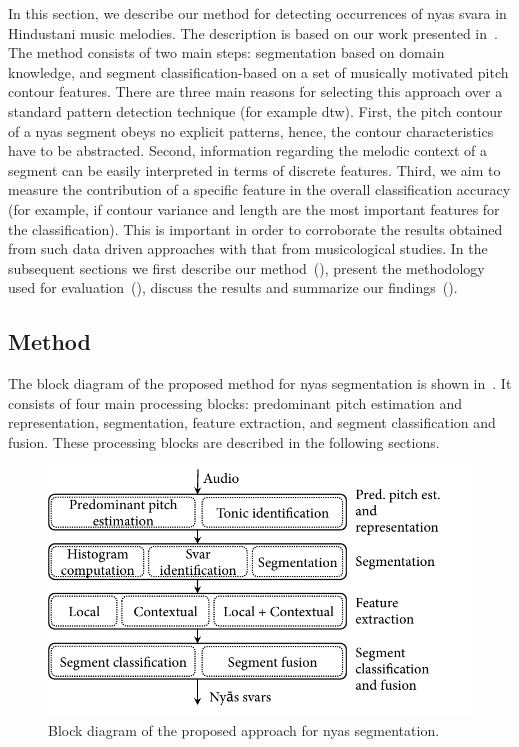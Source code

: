 {In this section, we describe our method for detecting occurrences of \gls{nyas} \gls{svara} in Hindustani music melodies. The description is based on our work presented in~\cite{gulati2014Landmark}. The method consists of two main steps: segmentation based on domain knowledge, and segment classification-based on a set of musically motivated pitch contour features. There are three main reasons for selecting this approach over a standard pattern detection technique (for example \gls{dtw}). First, the pitch contour of a \gls{nyas} segment obeys no explicit patterns, hence, the contour characteristics have to be abstracted. Second, information regarding the melodic context of a segment can be easily interpreted in terms of discrete features. Third, we aim to measure the contribution of a specific feature in the overall classification accuracy (for example, if contour variance and length are the most important features for the classification). This is important in order to corroborate the results obtained from such data driven approaches with that from musicological studies. In the subsequent sections we first describe our method~(), present the methodology used for evaluation~(), discuss the results and summarize our findings~().

\subsection{Method}
\label{sec:pre_processing_nyas_id_method}

The block diagram of the proposed method for \gls{nyas} segmentation is shown in~. It consists of four main processing blocks: predominant pitch estimation and representation, segmentation, feature extraction, and segment classification and fusion. These processing blocks are described in the following sections.

\begin{figure}
	\begin{center}
		\includegraphics[width=\figSizeEightyFive]{ch05_preprocessing/figures/BlockDiagramNyasSegmentation.pdf}
	\end{center}
	\caption{Block diagram of the proposed approach for \gls{nyas} segmentation.}
	\label{fig:bd_nyas_segmentation}
\end{figure}

}
